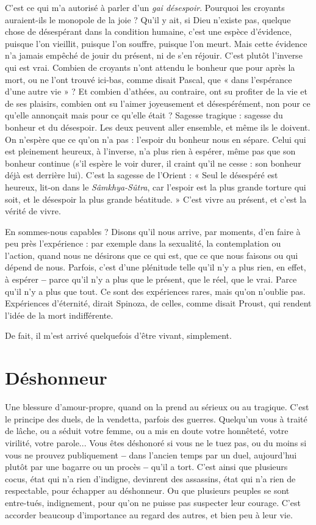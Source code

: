 C’est ce qui m’a autorisé à parler d’un {\it gai désespoir}. Pourquoi les croyants
auraient-ils le monopole de la joie ? Qu'il y ait, si Dieu n’existe pas, quelque
chose de désespérant dans la condition humaine, c’est une espèce d’évidence,
puisque l’on vieillit, puisque l’on souffre, puisque l’on meurt. Mais cette évidence
n’a jamais empêché de jouir du présent, ni de s’en réjouir. C’est plutôt
l'inverse qui est vrai. Combien de croyants n’ont attendu le bonheur que pour
après la mort, ou ne l’ont trouvé ici-bas, comme disait Pascal, que « dans l’espérance
d’une autre vie » ? Et combien d’athées, au contraire, ont su profiter de
la vie et de ses plaisirs, combien ont su l’aimer joyeusement et désespérément,
non pour ce qu’elle annonçait mais pour ce qu’elle était ? Sagesse tragique :
sagesse du bonheur et du désespoir. Les deux peuvent aller ensemble, et même
ils le doivent. On n’espère que ce qu’on n’a pas : l'espoir du bonheur nous en
sépare. Celui qui est pleinement heureux, à l’inverse, n’a plus rien à espérer,
même pas que son bonheur continue (s’il espère le voir durer, il craint qu’il ne
cesse : son bonheur déjà est derrière lui). C’est la sagesse de l'Orient : « Seul le
désespéré est heureux, lit-on dans le {\it Sâmkhya-Sûtra}, car l'espoir est la plus
grande torture qui soit, et le désespoir la plus grande béatitude. » C’est vivre au
présent, et c’est la vérité de vivre.

En sommes-nous capables ? Disons qu’il nous arrive, par moments, d’en
faire à peu près l’expérience : par exemple dans la sexualité, la contemplation
ou l’action, quand nous ne désirons que ce qui est, que ce que nous faisons ou
qui dépend de nous. Parfois, c’est d’une plénitude telle qu’il n’y a plus rien, en
effet, à espérer {\bf --} parce qu’il n’y a plus que le présent, que le réel, que le vrai.
Parce qu’il n’y a plus que tout. Ce sont des expériences rares, mais qu’on
n'oublie pas. Expériences d’éternité, dirait Spinoza, de celles, comme disait
Proust, qui rendent l’idée de la mort indifférente.

De fait, il m'est arrivé quelquefois d’être vivant, simplement.

\section{Déshonneur}
Une blessure d’amour-propre, quand on la prend au sérieux
ou au tragique. C’est le principe des duels, de la vendetta,
parfois des guerres. Quelqu'un vous à traité de lâche, ou a séduit votre femme,
ou a mis en doute votre honnêteté, votre virilité, votre parole... Vous êtes
déshonoré si vous ne le tuez pas, ou du moins si vous ne prouvez publiquement
{\bf --} dans l’ancien temps par un duel, aujourd’hui plutôt par une bagarre ou un
procès {\bf --} qu’il a tort. C’est ainsi que plusieurs cocus, état qui n’a rien d’indigne,
devinrent des assassins, état qui n’a rien de respectable, pour échapper au
déshonneur. Ou que plusieurs peuples se sont entre-tués, indignement, pour
qu'on ne puisse pas suspecter leur courage. C’est accorder beaucoup d’importance
au regard des autres, et bien peu à leur vie.

